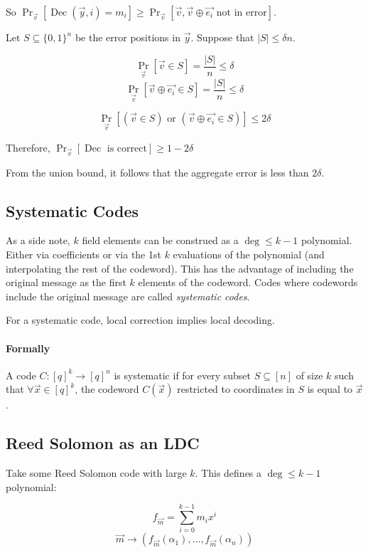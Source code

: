 \documentclass{idc_msc}
\DeclareMathOperator*{\Dec}{Dec}
\begin{document}
So \(\Pr_{\vec{v}}[\Dec(\vec{y}, i) = m_i] \ge \Pr_{\vec{v}}[\vec{v},\vec{v} \oplus \vec{e_i}\text{ not in error}]\).

Let \(S \subseteq \{0,1\}^n\) be the error positions in \(\vec{y}\).
Suppose that \(|S| \le \delta n\).

\[\Pr_{\vec{v}}[\vec{v} \in S] = \frac{|S|}{n} \le \delta\]
\[\Pr_{\vec{v}}[\vec{v} \oplus \vec{e_i} \in S] = \frac{|S|}{n} \le \delta\]

\[\Pr_{\vec{v}}[(\vec{v} \in S) \text{ or } (\vec{v} \oplus \vec{e_i} \in S)] \le 2 \delta\]

Therefore, \(\Pr_{\vec{v}}[\Dec \text{ is correct}] \ge 1 - 2\delta\)

From the union bound, it follows that the aggregate error is less than \(2\delta\).

\subsection{Systematic Codes}


As a side note, \(k\) field elements can be construed as a \(\deg \le k-1\) polynomial.
Either via coefficients or via the 1st \(k\) evaluations of the polynomial (and interpolating the rest of the codeword).
This has the advantage of including the original message as the first \(k\) elements of the codeword.
Codes where codewords include the original message are called \emph{systematic codes}.

For a systematic code, local correction implies local decoding.

\paragraph{Formally}

A code \(C : [q]^k \to [q]^n\) is systematic if for every subset \(S \subseteq [n]\) of size \(k\) such that \(\forall \vec{x} \in [q]^k\), the codeword \(C(\vec{x})\) restricted to coordinates in \(S\) is equal to \(\vec{x}\).

\subsection{Reed Solomon as an LDC}

Take some Reed Solomon code with large \(k\). This defines a \(\deg \le k-1\) polynomial:

\[f_{\vec{m}} = \sum_{i=0}^{k-1} m_i x^i\]
\[\vec{m} \to (f_{\vec{m}}(\alpha_1), \ldots, f_{\vec{m}}(\alpha_n))\]
\end{document}
